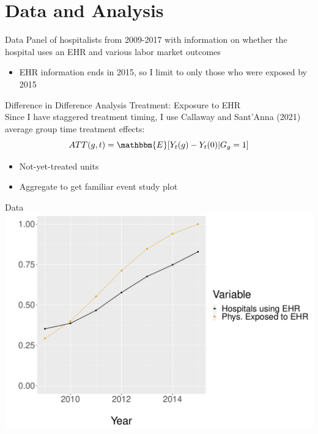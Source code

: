 \documentclass[10pt]{beamer}
\begin{document}
\section{Data and Analysis}

\begin{frame}[fragile]{Data}
Panel of hospitalists from 2009-2017 with information on whether the hospital uses an EHR and various labor market outcomes\\
                \vspace{3mm}
\begin{itemize}
    \item EHR information ends in 2015, so I limit to only those who were exposed by 2015
\end{itemize}
\end{frame}


\begin{frame}{Difference in Difference Analysis}
Treatment: Exposure to EHR\\
                \vspace{4mm}
Since I have staggered treatment timing, I use Callaway and Sant'Anna (2021) average group time treatment effects:
$$ATT(g,t)=\mathbbm{E}[Y_t(g)-Y_t(0)|G_g=1]$$
                \vspace{3mm}
\begin{itemize}
    \item Not-yet-treated units
    \item Aggregate to get familiar event study plot
\end{itemize}
\end{frame}


\begin{frame}{Data}
\centering
\includegraphics[scale=.4]{Objects/sum_stats_year.pdf}
\end{frame}
\end{document}
